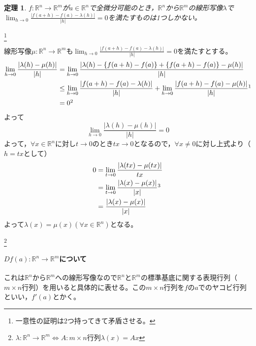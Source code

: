\documentclass[dvipdfmx,a4j,10pt]{jsarticle}
\makeatletter
\theoremstyle{mystyle1}
\newtheorem{thm}[dfn]{定理}
\theoremstyle{mystyle2}
\renewenvironment{proof}[1][\proofname]{\par
  \pushQED{\qed}%
  \normalfont
  \topsep6\p@\@plus6\p@ \trivlist
  \item[\hskip\labelsep{\bfseries\sffamily #1}]\ignorespaces
}{%
  \popQED\endtrivlist\@endpefalse
}
\renewcommand\proofname{証明}
\makeatother
\begin{document}
\newpage

\begin{framed}
	\begin{thm}
		$f:\mathbb{R}^n\to\mathbb{R}^m$が$a\in\mathbb{R}^n$で全微分可能のとき，$\mathbb{R}^n$から$\mathbb{R}^m$の線形写像$\lambda$で$\displaystyle \lim_{h\to 0}\frac{|f(a+h)-f(a)-\lambda(h)|}{|h|}=0 $を満たすものは1つしかない。
	\end{thm}
\end{framed}

\footnote{一意性の証明は2つ持ってきて矛盾させる。}

\begin{proof}
	線形写像$\mu:\mathbb{R}^n\to\mathbb{R}^m$も$\displaystyle \lim_{h\to 0}\frac{|f(a+h)-f(a)-\lambda(h)|}{|h|}=0$を満たすとする。
	\[
	\begin{split}
	\lim_{h\to 0}\frac{|\lambda(h)-\mu(h)|}{|h|}
	&= \lim_{h\to0}\frac{|\lambda(h)-\{f(a+h)-f(a)\}+\{f(a+h)-f(a)\}-\mu(h)|}{|h|}\\
	&\leq\lim_{h\to0}\frac{|f(a+h)-f(a)-\lambda(h)|}{|h|}+\lim_{h\to0}\frac{|f(a+h)-f(a)-\mu(h)|}{|h|}\footnotemark\\
	&= 0\footnotemark
	\end{split}
	\]
	よって
	\[
	\lim_{h\to0}\frac{|\lambda(h)-\mu(h)|}{|h|}=0
	\]
	よって，$\forall x\in\mathbb{R}^n$に対し$t\to0$のとき$tx\to0$となるので，$\forall x\neq0$に対し上式より（$h=tx$として）
	\[
	\begin{split}
	0 &=\lim_{t\to0}\frac{|\lambda(tx)-\mu(tx)|}{tx}\\
	&= \lim_{t\to0}\frac{|\lambda(x)-\mu(x)|}{|x|}\footnotemark\\
	&= \frac{|\lambda(x)-\mu(x)|}{|x|}
	\end{split}
	\]
	よって$\lambda(x)=\mu(x)$$(\forall x\in\mathbb{R}^n)$となる。
\end{proof}

\footnote{$\lambda:\mathbb{R}^n\to\mathbb{R}^m\Leftrightarrow A:m\times n$行列$\lambda(x)=Ax$}

\newpage

\paragraph{$Df(a):\mathbb{R}^n\to\mathbb{R}^m$について}
これは$\mathbb{R}^n$から$\mathbb{R}^m$への線形写像なので$\mathbb{R}^n$と$\mathbb{R}^m$の標準基底に関する表現行列（$m\times n$行列）を用いると具体的に表せる。この$m\times n$行列を$f$の$a$でのヤコビ行列といい，$f'(a)$とかく。
\end{document}
